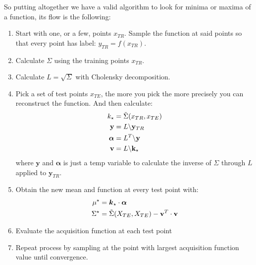 \documentclass{article}
\begin{document}
So putting altogether we have a valid algorithm to look for minima or maxima of a function, its flow is the following:
\begin{enumerate}
    \item Start with one, or a few, points $x_{TR}$. Sample the function at said points so that every point has label: $y_{TR} = f(x_{TR})$.
    \item Calculate $\Sigma$ using the training points $x_{TR}$.
    \item Calculate $ L = \sqrt{\Sigma}$ with Cholensky decomposition.
    \item Pick a set of test points $x_{TE}$, the more you pick the more precisely you can reconstruct the function. And then calculate:
    \begin{align}
        k_\star &= \Tilde{\Sigma}(x_{TR}, x_{TE}) \\
        \mathbf{y} &= L \backslash \mathbf{y}_{TR} \\
        \boldsymbol{\alpha} &= L^T \backslash \mathbf{y} \\
        \mathbf{v} &= L \backslash \mathbf{k}_\star
    \end{align}
    where $\mathbf{y}$ and $\mathbf{\alpha}$ is just a temp variable to calculate the inverse of $\Sigma$ through $L$ applied to $\mathbf{y}_{TR}$.
    \item Obtain the new mean and function at every test point with:
    \begin{align}
        \mu^\star &= \boldsymbol{k}_\star \cdot \boldsymbol{\alpha}\\
        \Sigma^\star &= \Tilde{\Sigma}(X_{TE}, X_{TE}) - \mathbf{v}^T \cdot \mathbf{v}
    \end{align}
    \item Evaluate the acquisition function at each test point
    \item Repeat process by sampling at the point with largest acquisition function value until convergence.
\end{enumerate}
\end{document}
